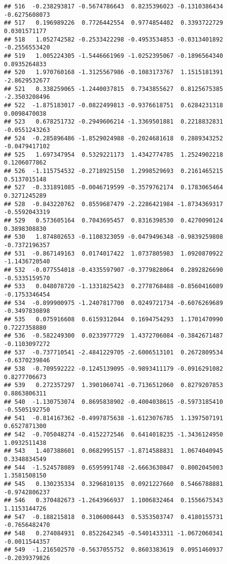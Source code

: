 \documentclass[
]{article}
\begin{document}
\begin{verbatim}
## 516  -0.238293817 -0.5674786643  0.8235396023 -0.1310386434 -0.6275608073
## 517   0.196989226  0.7726442554  0.9774854402  0.3393722729  0.0301571177
## 518   1.052742582 -0.2533422298 -0.4953534853 -0.0313401892 -0.2556553420
## 519   1.005224305 -1.5446661969 -1.0252395067 -0.1896564340  0.8935264833
## 520   1.970760168 -1.3125567986 -0.1083173767  1.1515181391 -2.8629532677
## 521   0.338259065 -1.2440037815  0.7343855627  0.8125675385 -2.3503208496
## 522  -1.875183017 -0.0822499813 -0.9376618751  0.6284231318  0.0098470038
## 523   0.678251732 -0.2949606214 -1.3369501881  0.2218832831 -0.0551243263
## 524  -0.285896486 -1.8529024988 -0.2024681618  0.2889343252 -0.0479417102
## 525   1.697347954  0.5329221173  1.4342774785  1.2524902218  0.1206077862
## 526  -1.115754532 -0.2718925150  1.2998529693  0.2161465215  0.5137015148
## 527  -0.331891085 -0.0046719599 -0.3579762174  0.1783065464  0.3271245289
## 528  -0.843220762  0.8559687479 -2.2286421984 -1.8734369317 -0.5592043319
## 529   0.573605164  0.7043695457  0.8316398530  0.4270090124  0.3898308830
## 530   1.874802653 -0.1108323059 -0.0479496348 -0.9839259808 -0.7372196357
## 531  -0.867149163  0.0174017422  1.0737805983  1.0920870922 -1.1436720540
## 532  -0.077554018 -0.4335597907 -0.3779828064  0.2892826690 -0.5335159570
## 533   0.048078720 -1.1331825423  0.2778768488 -0.8560416089 -0.1753346454
## 534  -0.899900975 -1.2407817700  0.0249721734 -0.6076269689 -0.3497830898
## 535   0.075916608  0.6159312044  0.1694754293  1.1701470990  0.7227358880
## 536  -0.582249300  0.0233977729  1.4372706084 -0.3842671487 -0.1103097272
## 537  -0.737710541 -2.4841229705 -2.6006513101  0.2672809534 -0.6370239846
## 538  -0.709592222 -0.1245139095 -0.9893411179 -0.0916291082  0.8277706673
## 539   0.272357297  1.3901060741 -0.7136512060  0.8279207853  0.8863806311
## 540  -1.130753074  0.8695838902 -0.4004038615 -0.5973185410 -0.5505192750
## 541  -0.814167362 -0.4997875638 -1.6123076785  1.1397507191  0.6527871300
## 542  -0.705048274 -0.4152272546  0.6414018235 -1.3436124950  1.0932511438
## 543   1.407388601  0.0682995157 -1.8714588831  1.0674040945  0.3348834549
## 544  -1.524578089  0.6595991748 -2.6663630847  0.8002045003  1.3581508150
## 545   0.130235334  0.3296810135  0.0921227660  0.5466788881 -0.9742806237
## 546   0.370482673 -1.2643966937  1.1006832464  0.1556675343  1.1153144726
## 547  -0.188215818  0.3106008443  0.5353503747  0.4180155731 -0.7656482470
## 548   0.274084931  0.8522642345 -0.5401433311 -1.0672060341 -0.0011544357
## 549  -1.216502570 -0.5637055752  0.8603383619  0.0951460937 -0.2039379826

\end{verbatim}
\end{document}
